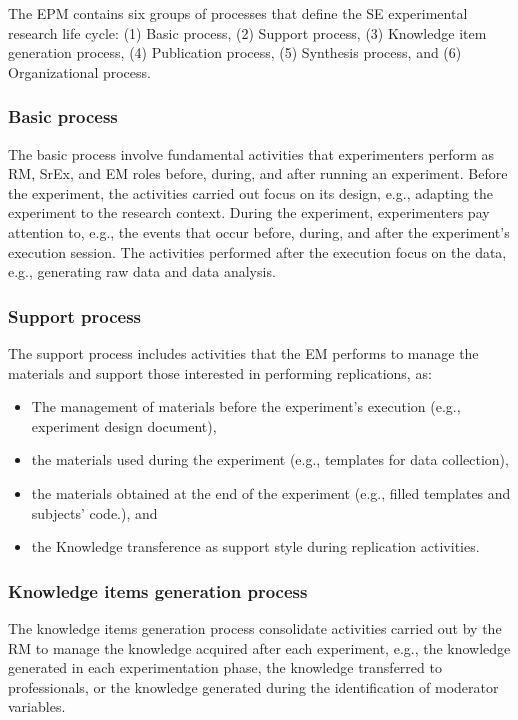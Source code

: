 The EPM contains six groups of processes that define the SE experimental research life cycle: (1) Basic process, (2) Support process, (3) Knowledge item generation process, (4) Publication process, (5) Synthesis process, and (6) Organizational process. 

\subsubsection{Basic process}
The basic process involve fundamental activities that experimenters perform as RM, SrEx, and EM roles before, during, and after running an experiment. Before the experiment, the activities carried out focus on its design, e.g., adapting the experiment to the research context. During the experiment, experimenters pay attention to, e.g., the events that occur before, during, and after the experiment's execution session. The activities performed after the execution focus on the data, e.g., generating raw data and data analysis.

\subsubsection{Support process}
The support process includes activities that the EM performs to manage the materials and support those interested in performing replications, as:

\begin{itemize}
	\item The management of materials before the experiment's execution (e.g., experiment design document), 
	\item the materials used during the experiment (e.g., templates for data collection), 
	\item the materials obtained at the end of the experiment (e.g., filled templates and subjects' code.), and
	\item the Knowledge transference as support style during replication activities.
\end{itemize}

\subsubsection{Knowledge items generation process}
The knowledge items generation process consolidate activities carried out by the RM to manage the knowledge acquired after each experiment, e.g., the knowledge generated in each experimentation phase, the knowledge transferred to professionals, or the knowledge generated during the identification of moderator variables.
   

